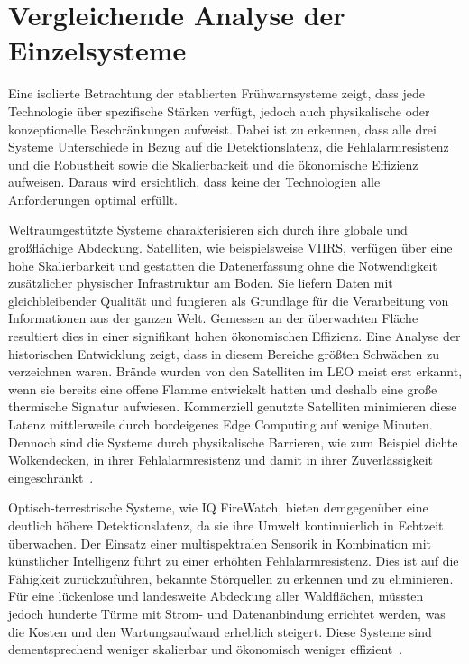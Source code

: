 \chapter{Vergleichende Analyse der Einzelsysteme}\label{ch:vergleichendeAnalyse}

Eine isolierte Betrachtung der etablierten Frühwarnsysteme zeigt, dass jede Technologie über spezifische Stärken verfügt, jedoch auch physikalische oder konzeptionelle Beschränkungen aufweist. Dabei ist zu erkennen, dass alle drei Systeme Unterschiede in Bezug auf die Detektionslatenz, die Fehlalarmresistenz und die Robustheit sowie die Skalierbarkeit und die ökonomische Effizienz aufweisen. Daraus wird ersichtlich, dass keine der Technologien alle Anforderungen optimal erfüllt.

Weltraumgestützte Systeme charakterisieren sich durch ihre globale und großflächige Abdeckung. Satelliten, wie beispielsweise \ac{VIIRS}, verfügen über eine hohe Skalierbarkeit und gestatten die Datenerfassung ohne die Notwendigkeit zusätzlicher physischer Infrastruktur am Boden. Sie liefern  Daten mit gleichbleibender Qualität und fungieren als Grundlage für die Verarbeitung von Informationen aus der ganzen Welt. Gemessen an der überwachten Fläche resultiert dies in einer signifikant hohen ökonomischen Effizienz. Eine Analyse der historischen Entwicklung zeigt, dass in diesem Bereiche größten Schwächen zu verzeichnen waren. Brände wurden von den Satelliten im \acs{LEO} meist erst erkannt, wenn sie bereits eine offene Flamme entwickelt hatten und deshalb eine große thermische Signatur aufwiesen. Kommerziell genutzte Satelliten minimieren diese Latenz mittlerweile durch bordeigenes Edge Computing auf wenige Minuten. Dennoch sind die Systeme durch physikalische Barrieren, wie zum Beispiel dichte Wolkendecken, in ihrer Fehlalarmresistenz und damit in ihrer Zuverlässigkeit eingeschränkt~\cite{DZLR2024, Seton2025,VIIRSLexikon}.

Optisch-terrestrische Systeme, wie IQ FireWatch, bieten demgegenüber eine deutlich höhere Detektionslatenz, da sie ihre Umwelt kontinuierlich in Echtzeit überwachen. Der Einsatz einer multispektralen Sensorik in Kombination mit künstlicher Intelligenz führt zu einer erhöhten Fehlalarmresistenz. Dies ist auf die Fähigkeit zurückzuführen, bekannte Störquellen zu erkennen und zu eliminieren. Für eine lückenlose und landesweite Abdeckung aller Waldflächen, müssten jedoch hunderte Türme mit Strom- und Datenanbindung errichtet werden, was die Kosten und den Wartungsaufwand erheblich steigert. Diese Systeme sind dementsprechend weniger skalierbar und ökonomisch weniger effizient~\cite{Gemmingen2022,Winter2021}.

